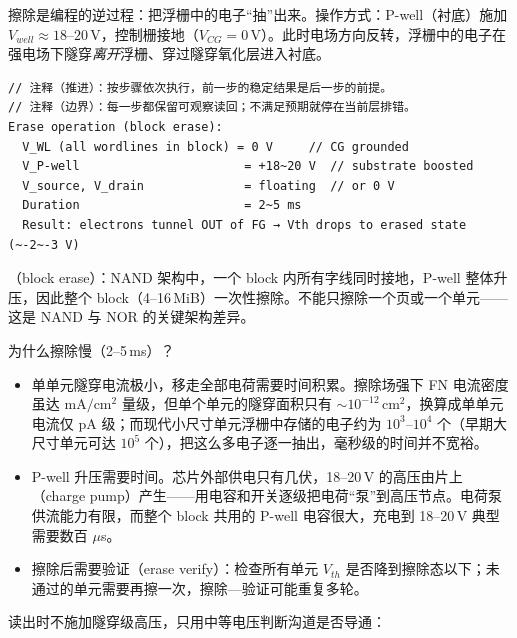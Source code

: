 擦除是编程的逆过程：把浮栅中的电子“抽”出来。操作方式：P-well（衬底）施加 $V_{well} \approx 18$--$20$\,V，控制栅接地（$V_{CG} = 0$\,V）。此时电场方向反转，浮栅中的电子在强电场下隧穿\emph{离开}浮栅、穿过隧穿氧化层进入衬底。

\begin{lstlisting}
// 注释（推进）：按步骤依次执行，前一步的稳定结果是后一步的前提。
// 注释（边界）：每一步都保留可观察读回；不满足预期就停在当前层排错。
Erase operation (block erase):
  V_WL (all wordlines in block) = 0 V     // CG grounded
  V_P-well                       = +18~20 V  // substrate boosted
  V_source, V_drain              = floating  // or 0 V
  Duration                       = 2~5 ms
  Result: electrons tunnel OUT of FG → Vth drops to erased state (~-2~-3 V)
\end{lstlisting}

（block erase）：NAND 架构中，一个 block 内所有字线同时接地，P-well 整体升压，因此整个 block（4--16\,MiB）一次性擦除。不能只擦除一个页或一个单元——这是 NAND 与 NOR 的关键架构差异。

为什么擦除慢（2--5\,ms）？
\begin{itemize}
  \item 单单元隧穿电流极小，移走全部电荷需要时间积累。擦除场强下 FN 电流密度虽达 $\mathrm{mA/cm^2}$ 量级，但单个单元的隧穿面积只有 $\sim$$10^{-12}$\,$\mathrm{cm^2}$，换算成单单元电流仅 pA 级；而现代小尺寸单元浮栅中存储的电子约为 $10^3$--$10^4$ 个（早期大尺寸单元可达 $10^5$ 个），把这么多电子逐一抽出，毫秒级的时间并不宽裕。
  \item P-well 升压需要时间。芯片外部供电只有几伏，18--20\,V 的高压由片上（charge pump）产生——用电容和开关逐级把电荷“泵”到高压节点。电荷泵供流能力有限，而整个 block 共用的 P-well 电容很大，充电到 18--20\,V 典型需要数百 $\mu$s。
  \item 擦除后需要验证（erase verify）：检查所有单元 $V_{th}$ 是否降到擦除态以下；未通过的单元需要再擦一次，擦除—验证可能重复多轮。
\end{itemize}



读出时不施加隧穿级高压，只用中等电压判断沟道是否导通：

